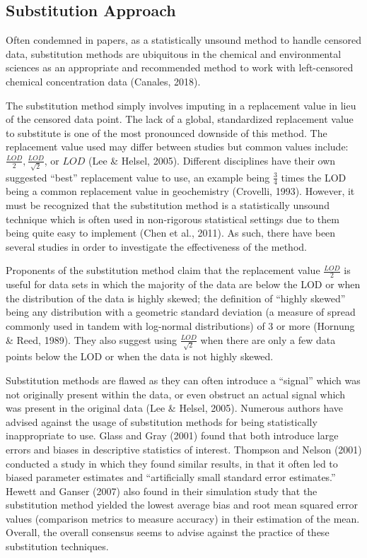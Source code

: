 \documentclass[12pt, twoside]{amherstthesis}
\begin{document}
\hypertarget{Substitution}{%
\subsection{Substitution Approach}\label{Substitution}}

Often condemned in papers, as a statistically unsound method to handle censored data, substitution methods are ubiquitous in the chemical and environmental sciences as an appropriate and recommended method to work with left-censored chemical concentration data (Canales, 2018).

The substitution method simply involves imputing in a replacement value in lieu of the censored data point. The lack of a global, standardized replacement value to substitute is one of the most pronounced downside of this method. The replacement value used may differ between studies but common values include: \(\frac{LOD}{2}, \frac{LOD}{\sqrt2}\), or \(LOD\) (Lee \& Helsel, 2005). Different disciplines have their own suggested ``best'' replacement value to use, an example being \(\frac{3}{4}\) times the LOD being a common replacement value in geochemistry (Crovelli, 1993). However, it must be recognized that the substitution method is a statistically unsound technique which is often used in non-rigorous statistical settings due to them being quite easy to implement (Chen et al., 2011). As such, there have been several studies in order to investigate the effectiveness of the method.

Proponents of the substitution method claim that the replacement value \(\frac{LOD}{2}\) is useful for data sets in which the majority of the data are below the LOD or when the distribution of the data is highly skewed; the definition of ``highly skewed'' being any distribution with a geometric standard deviation (a measure of spread commonly used in tandem with log-normal distributions) of 3 or more (Hornung \& Reed, 1989). They also suggest using \(\frac{LOD}{\sqrt2}\) when there are only a few data points below the LOD or when the data is not highly skewed.

Substitution methods are flawed as they can often introduce a ``signal'' which was not originally present within the data, or even obstruct an actual signal which was present in the original data (Lee \& Helsel, 2005). Numerous authors have advised against the usage of substitution methods for being statistically inappropriate to use. Glass and Gray (2001) found that both introduce large errors and biases in descriptive statistics of interest. Thompson and Nelson (2001) conducted a study in which they found similar results, in that it often led to biased parameter estimates and ``artificially small standard error estimates.'' Hewett and Ganser (2007) also found in their simulation study that the substitution method yielded the lowest average bias and root mean squared error values (comparison metrics to measure accuracy) in their estimation of the mean. Overall, the overall consensus seems to advise against the practice of these substitution techniques.
\end{document}
